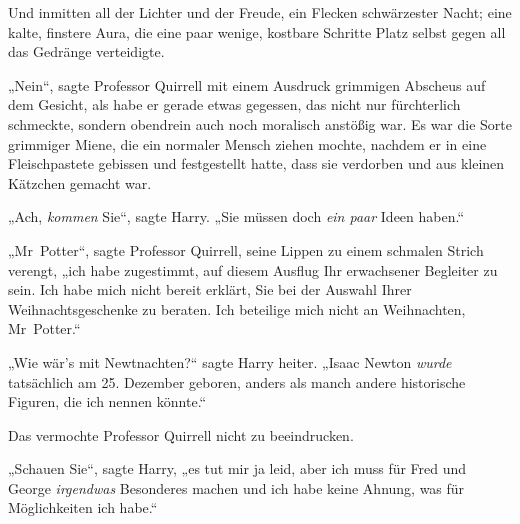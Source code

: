 Und inmitten all der Lichter und der Freude, ein Flecken schwärzester Nacht; eine kalte, finstere Aura, die eine paar wenige, kostbare Schritte Platz selbst gegen all das Gedränge verteidigte.

„Nein“, sagte Professor Quirrell mit einem Ausdruck grimmigen Abscheus auf dem Gesicht, als habe er gerade etwas gegessen, das nicht nur fürchterlich schmeckte, sondern obendrein auch noch moralisch anstößig war. Es war die Sorte grimmiger Miene, die ein normaler Mensch ziehen mochte, nachdem er in eine Fleischpastete gebissen und festgestellt hatte, dass sie verdorben und aus kleinen Kätzchen gemacht war.

„Ach, \emph{kommen} Sie“, sagte Harry. „Sie müssen doch \emph{ein paar} Ideen haben.“

„Mr~Potter“, sagte Professor Quirrell, seine Lippen zu einem schmalen Strich verengt, „ich habe zugestimmt, auf diesem Ausflug Ihr erwachsener Begleiter zu sein. Ich habe mich nicht bereit erklärt, Sie bei der Auswahl Ihrer Weihnachtsgeschenke zu beraten. Ich beteilige mich nicht an Weihnachten, Mr~Potter.“

„Wie wär’s mit Newtnachten?“ sagte Harry heiter. „Isaac Newton \emph{wurde} tatsächlich am 25. Dezember geboren, anders als manch andere historische Figuren, die ich nennen könnte.“

Das vermochte Professor Quirrell nicht zu beeindrucken.

„Schauen Sie“, sagte Harry, „es tut mir ja leid, aber ich muss für Fred und George \emph{irgendwas} Besonderes machen und ich habe keine Ahnung, was für Möglichkeiten ich habe.“

